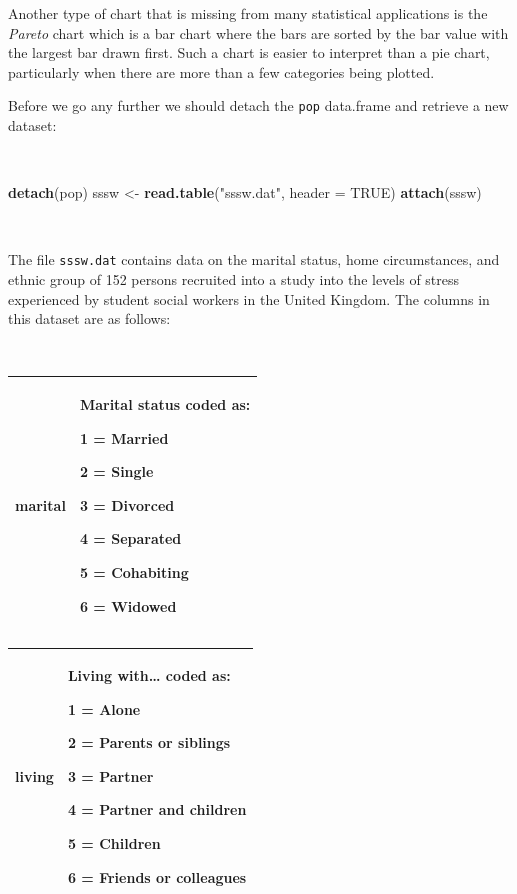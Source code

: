 \documentclass[12pt,a4paper]{book}
\newenvironment{Shaded}{\begin{snugshade}}{\end{snugshade}}
\newcommand{\DataTypeTok}[1]{\textcolor[rgb]{0.13,0.29,0.53}{#1}}
\newcommand{\KeywordTok}[1]{\textcolor[rgb]{0.13,0.29,0.53}{\textbf{#1}}}
\newcommand{\NormalTok}[1]{#1}
\newcommand{\OtherTok}[1]{\textcolor[rgb]{0.56,0.35,0.01}{#1}}
\newcommand{\StringTok}[1]{\textcolor[rgb]{0.31,0.60,0.02}{#1}}
\theoremstyle{definition}
\theoremstyle{definition}
\theoremstyle{definition}
\theoremstyle{remark}
\begin{document}
Another type of chart that is missing from many statistical applications
is the \emph{Pareto} chart which is a bar chart where the bars are
sorted by the bar value with the largest bar drawn first. Such a chart
is easier to interpret than a pie chart, particularly when there are
more than a few categories being plotted.

Before we go any further we should detach the \texttt{pop} data.frame
and retrieve a new dataset:

~

\begin{Shaded}
\begin{Highlighting}[]
\KeywordTok{detach}\NormalTok{(pop)}
\NormalTok{sssw <-}\StringTok{ }\KeywordTok{read.table}\NormalTok{(}\StringTok{"sssw.dat"}\NormalTok{, }\DataTypeTok{header =} \OtherTok{TRUE}\NormalTok{)}
\KeywordTok{attach}\NormalTok{(sssw)}
\end{Highlighting}
\end{Shaded}

~

The file \texttt{sssw.dat} contains data on the marital status, home
circumstances, and ethnic group of 152 persons recruited into a study
into the levels of stress experienced by student social workers in the
United Kingdom. The columns in this dataset are as follows:

~

\begin{longtable}[]{@{}ll@{}}
\toprule
\endhead
\begin{minipage}[t]{0.21\columnwidth}\raggedright
\textbf{marital}\strut
\end{minipage} & \begin{minipage}[t]{0.54\columnwidth}\raggedright
Marital status coded as:

1 = Married

2 = Single

3 = Divorced

4 = Separated

5 = Cohabiting

6 = Widowed\strut
\end{minipage}\tabularnewline
\bottomrule
\end{longtable}

\begin{longtable}[]{@{}ll@{}}
\toprule
\endhead
\begin{minipage}[t]{0.21\columnwidth}\raggedright
\textbf{living}\strut
\end{minipage} & \begin{minipage}[t]{0.54\columnwidth}\raggedright
Living with\ldots{} coded as:

1 = Alone

2 = Parents or siblings

3 = Partner

4 = Partner and children

5 = Children

6 = Friends or colleagues\strut
\end{minipage}\tabularnewline
\bottomrule
\end{longtable}
\end{document}
